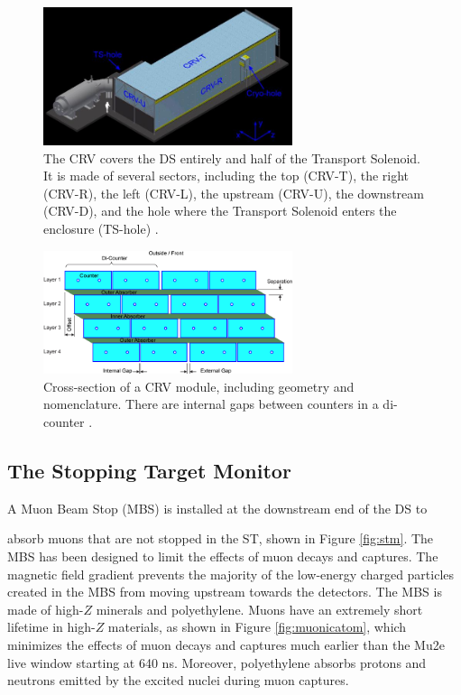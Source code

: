 \begin{figure}[!h]
\centering
\includegraphics[width =0.65\textwidth]{figures/jpg/Crv_downstream.jpg}
\caption[The CRV features and components.]{The CRV covers the DS entirely and half 
of the Transport Solenoid. It is made of several sectors, including the top 
(CRV-T), the right (CRV-R), the left (CRV-L), the upstream (CRV-U), the downstream 
(CRV-D), and the hole where the Transport Solenoid enters the enclosure (TS-hole) \cite{bartoszek2015mu2e}.}
\label{fig:crv}
\end{figure}

\begin{figure}[!h]
\centering
\includegraphics[width =0.65\textwidth]{figures/png/Crv_module_geometry.png}
\caption[The cross-section of a CRV module.]{Cross-section of a CRV module, including geometry and nomenclature. 
There are internal gaps between counters in a di-counter \cite{Giovannella_2020}.}
\label{fig:crvmodule}
\end{figure}
\subsection{The Stopping Target Monitor}
{\red A Muon Beam Stop (MBS)} is installed at the downstream end of the DS to

absorb muons that are not stopped in the ST, shown in Figure \ref{fig:stm}. 
The MBS has been designed to limit the effects of muon decays and captures. 
The magnetic field gradient prevents the majority of the low-energy charged 
particles created in the MBS from moving upstream towards the detectors.  
The MBS is made of high-$Z$ minerals and polyethylene. Muons have an extremely short lifetime in 
high-$Z$ materials, as shown in Figure \ref{fig:muonicatom}, which minimizes the effects of muon 
decays and captures much earlier than the Mu2e live window starting at 640 ns. Moreover, polyethylene 
absorbs protons and neutrons emitted by the excited nuclei during muon captures.  

